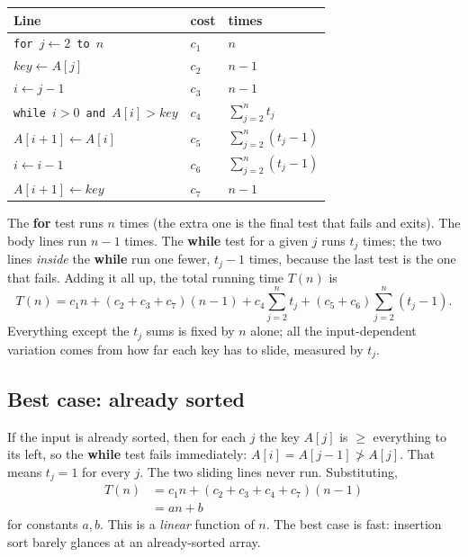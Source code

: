 \begin{center}
\renewcommand{\arraystretch}{1.35}
\begin{tabular}{l l l}
\toprule
\textbf{Line} & \textbf{cost} & \textbf{times} \\
\midrule
\texttt{for $j \leftarrow 2$ to $n$}      & $c_1$ & $n$ \\
\quad $\mathit{key} \leftarrow A[j]$        & $c_2$ & $n-1$ \\
\quad $i \leftarrow j-1$                    & $c_3$ & $n-1$ \\
\quad \texttt{while $i>0$ and $A[i]>key$}   & $c_4$ & $\sum_{j=2}^{n} t_j$ \\
\quad\quad $A[i+1] \leftarrow A[i]$         & $c_5$ & $\sum_{j=2}^{n} (t_j-1)$ \\
\quad\quad $i \leftarrow i-1$               & $c_6$ & $\sum_{j=2}^{n} (t_j-1)$ \\
\quad $A[i+1] \leftarrow \mathit{key}$      & $c_7$ & $n-1$ \\
\bottomrule
\end{tabular}
\end{center}

The \textbf{for} test runs $n$ times (the extra one is the final test that fails and
exits). The body lines run $n-1$ times. The \textbf{while} test for a given $j$ runs
$t_j$ times; the two lines \emph{inside} the \textbf{while} run one fewer, $t_j - 1$
times, because the last test is the one that fails. Adding it all up, the total running
time $T(n)$ is
\[
T(n) = c_1 n + (c_2 + c_3 + c_7)(n-1) + c_4 \sum_{j=2}^{n} t_j
       + (c_5 + c_6) \sum_{j=2}^{n} (t_j - 1).
\]
Everything except the $t_j$ sums is fixed by $n$ alone; all the input-dependent
variation comes from how far each key has to slide, measured by $t_j$.

\subsection{Best case: already sorted}

If the input is already sorted, then for each $j$ the key $A[j]$ is $\ge$ everything to
its left, so the \textbf{while} test fails immediately: $A[i] = A[j-1] \not> A[j]$.
That means $t_j = 1$ for every $j$. The two sliding lines never run. Substituting,
\begin{align*}
T(n) &= c_1 n + (c_2 + c_3 + c_4 + c_7)(n-1) \\
     &= an + b
\end{align*}
for constants $a, b$. This is a \emph{linear} function of $n$. The best case is fast:
insertion sort barely glances at an already-sorted array.

